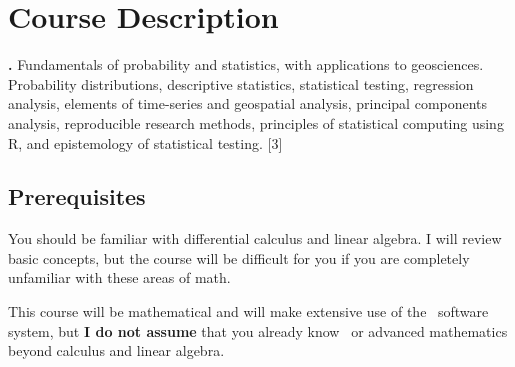 \documentclass[11pt,twoside]{jgsyllabus}\usepackage[]{graphicx}\usepackage[]{xcolor}
\begin{document}
\medskip
\section[Description]{Course Description}

\textbf{\ShortCourseName.}
Fundamentals of probability and statistics, with applications to
geosciences.
Probability distributions, descriptive statistics, statistical testing,
regression analysis, elements of time-series and geospatial analysis,
principal components analysis, reproducible research methods,
principles of statistical computing using R, and epistemology of
statistical testing. [3]

\subsection{Prerequisites}

You should be familiar with differential calculus and linear algebra.
I will review basic concepts, but the course will be difficult for you if you
are completely unfamiliar with these areas of math.

This course will be mathematical and will make extensive use of the \Rstats\
software system, but
\textbf{I do not assume} that you already know \Rstats\ or advanced
mathematics beyond calculus and linear algebra.

\iftrue
\end{document}
